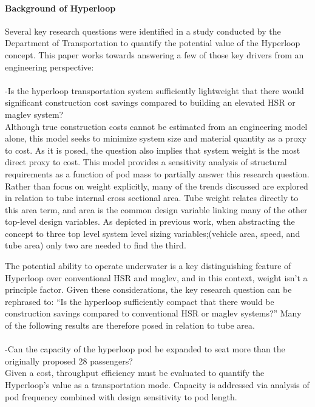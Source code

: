 \paragraph{Background of Hyperloop}

	Several key research questions were identified in a study conducted by the
	Department of Transportation to quantify the potential value of the
	Hyperloop concept. \cite{Volpe} This paper works towards answering a few of
	those key drivers from an engineering perspective:\\
	\\
	-Is the hyperloop transportation system sufficiently lightweight that there
	would significant construction cost savings compared to building an
	elevated HSR or maglev system?\\

	Although true construction costs cannot be estimated from an engineering
	model alone, this model seeks to minimize system size and material quantity
	as a proxy to cost. As it is posed, the question also implies
	that system weight is the most direct proxy to cost. This model provides a sensitivity
	analysis of structural requirements as a function of pod mass to partially
	answer this research question. Rather than focus on weight explicitly,
	many of the trends discussed are explored in relation to tube internal
	cross sectional area. Tube weight relates directly to this area term, and
	area is the common design variable linking many of the other top-level
	design variables. As depicted in previous work,
	\cite{Chin} when abstracting the concept to three top level system level
	sizing variables;(vehicle area, speed, and tube area) only two are needed
	to find the third.

	The potential ability to operate underwater is a key distinguishing feature
	of Hyperloop over conventional HSR and maglev, and in this context, weight
	isn't a principle factor. Given these considerations, the key research
	question can be rephrased to: ``Is the hyperloop sufficiently compact that
	there would be construction savings compared to conventional
	HSR or maglev systems?'' Many of the following results are therefore posed
	in relation to tube area.\\
	\\
	-Can the capacity of the hyperloop pod be expanded to seat more than the
	originally proposed 28 passengers?\\

	Given a cost, throughput efficiency must be evaluated to quantify the
	Hyperloop's value as a transportation mode.
	Capacity is addressed via analysis of pod frequency combined with design
	sensitivity to pod length.\\

